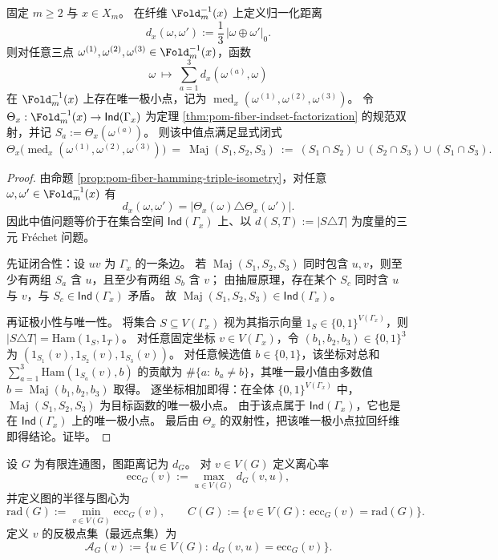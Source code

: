 \begin{theorem}[纤维三元中值的多数闭式]\label{thm:pom-fiber-triple-median-majority}
固定 \(m\ge 2\) 与 \(x\in X_m\)。
在纤维 \(\Fold_m^{-1}(x)\) 上定义归一化距离
\[
d_x(\omega,\omega'):=\frac13\,|\omega\oplus\omega'|_0.
\]
则对任意三点 \(\omega^{(1)},\omega^{(2)},\omega^{(3)}\in \Fold_m^{-1}(x)\)，函数
\[
\omega\ \longmapsto\ \sum_{a=1}^3 d_x(\omega^{(a)},\omega)
\]
在 \(\Fold_m^{-1}(x)\) 上存在唯一极小点，记为 \(\operatorname{med}_x(\omega^{(1)},\omega^{(2)},\omega^{(3)})\)。
令 \(\Theta_x:\Fold_m^{-1}(x)\to \mathsf{Ind}(\Gamma_x)\) 为定理 \ref{thm:pom-fiber-indset-factorization} 的规范双射，并记 \(S_a:=\Theta_x(\omega^{(a)})\)。
则该中值点满足显式闭式
\[
\Theta_x\!\bigl(\operatorname{med}_x(\omega^{(1)},\omega^{(2)},\omega^{(3)})\bigr)
\ =\
\operatorname{Maj}(S_1,S_2,S_3)
\ :=\
(S_1\cap S_2)\cup(S_2\cap S_3)\cup(S_1\cap S_3).
\]
\end{theorem}
\begin{proof}
由命题 \ref{prop:pom-fiber-hamming-triple-isometry}，对任意 \(\omega,\omega'\in\Fold_m^{-1}(x)\) 有
\[
d_x(\omega,\omega')
=\bigl|\Theta_x(\omega)\triangle \Theta_x(\omega')\bigr|.
\]
因此中值问题等价于在集合空间 \(\mathsf{Ind}(\Gamma_x)\) 上、以 \(d(S,T):=|S\triangle T|\) 为度量的三元 Fr\'echet 问题。
\par
先证闭合性：设 \(uv\) 为 \(\Gamma_x\) 的一条边。
若 \(\operatorname{Maj}(S_1,S_2,S_3)\) 同时包含 \(u,v\)，则至少有两组 \(S_a\) 含 \(u\)，且至少有两组 \(S_b\) 含 \(v\)；
由抽屉原理，存在某个 \(S_c\) 同时含 \(u\) 与 \(v\)，与 \(S_c\in\mathsf{Ind}(\Gamma_x)\) 矛盾。
故 \(\operatorname{Maj}(S_1,S_2,S_3)\in\mathsf{Ind}(\Gamma_x)\)。
\par
再证极小性与唯一性。
将集合 \(S\subseteq V(\Gamma_x)\) 视为其指示向量 \(1_S\in\{0,1\}^{V(\Gamma_x)}\)，则
\(
|S\triangle T|
=\mathrm{Ham}(1_S,1_T)
\)。
对任意固定坐标 \(v\in V(\Gamma_x)\)，令 \((b_1,b_2,b_3)\in\{0,1\}^3\) 为 \((1_{S_1}(v),1_{S_2}(v),1_{S_3}(v))\)。
对任意候选值 \(b\in\{0,1\}\)，该坐标对总和 \(\sum_{a=1}^3 \mathrm{Ham}(1_{S_a}(v),b)\) 的贡献为 \(\#\{a:\ b_a\ne b\}\)，其唯一最小值由多数值 \(b=\operatorname{Maj}(b_1,b_2,b_3)\) 取得。
逐坐标相加即得：在全体 \(\{0,1\}^{V(\Gamma_x)}\) 中，\(\operatorname{Maj}(S_1,S_2,S_3)\) 为目标函数的唯一极小点。
由于该点属于 \(\mathsf{Ind}(\Gamma_x)\)，它也是在 \(\mathsf{Ind}(\Gamma_x)\) 上的唯一极小点。
最后由 \(\Theta_x\) 的双射性，把该唯一极小点拉回纤维即得结论。证毕。
\end{proof}

\begin{definition}\label{def:pom-fibcube-ecc-rad-center-antipodes}
设 \(G\) 为有限连通图，图距离记为 \(d_G\)。
对 \(v\in V(G)\) 定义离心率
\[
\mathrm{ecc}_G(v):=\max_{u\in V(G)} d_G(v,u),
\]
并定义图的半径与图心为
\[
\mathrm{rad}(G):=\min_{v\in V(G)}\mathrm{ecc}_G(v),
\qquad
C(G):=\{v\in V(G):\ \mathrm{ecc}_G(v)=\mathrm{rad}(G)\}.
\]
定义 \(v\) 的反极点集（最远点集）为
\[
\mathcal{A}_G(v):=\{u\in V(G):\ d_G(v,u)=\mathrm{ecc}_G(v)\}.
\]
\end{definition}

